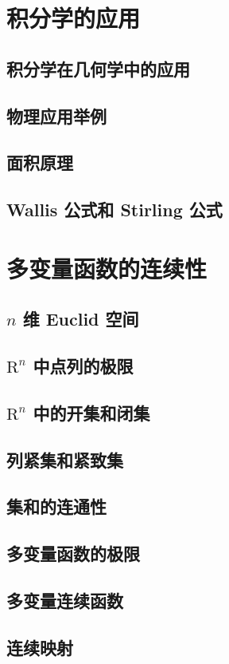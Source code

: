 \documentclass[a4paper, 12pt]{ctexbook}
\begin{document}
    \chapter{积分学的应用}
        \section{积分学在几何学中的应用}
        \section{物理应用举例}
        \section{面积原理}
        \section{Wallis 公式和 Stirling 公式}
    \chapter{多变量函数的连续性}
        \section{$n$ 维 Euclid 空间}
        \section{$\mathrm{R}^n$ 中点列的极限}
        \section{$\mathrm{R}^n$ 中的开集和闭集}
        \section{列紧集和紧致集}
        \section{集和的连通性}
        \section{多变量函数的极限}
        \section{多变量连续函数}
        \section{连续映射}
\end{document}
